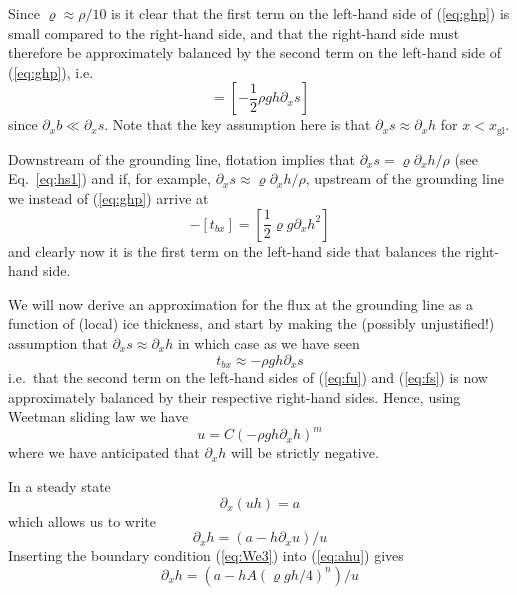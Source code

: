 \documentclass[10pt,a4paper]{book}
\newcommand{\p}{\partial}
\newcommand{\xgl}{x_{\mathrm{gl}}}
\begin{document}
Since $\varrho \approx \rho/10$ is it
clear that the first term on the left-hand side of (\ref{eq:ghp}) is
small compared to the right-hand side, and that the right-hand side
must therefore be approximately balanced by the second term on the
left-hand side of (\ref{eq:ghp}), i.e.
\begin{equation}
  [t_{bx}] = [-\frac{1}{2} \rho g h \p_x s]
\label{eq:ghp2}
\end{equation}
since $\p_x b \ll \p_x s$.  Note that the key assumption here is that
$\p_x s \approx \p_x h$ for $x < \xgl$.

Downstream of the
grounding line, flotation implies that $\p_x s = \varrho \p_x h/\rho$
(see Eq.~\ref{eq:hs1}) and if, for example, $\p_x s \approx 
\varrho \p_x h / \rho$, upstream of the grounding line we instead of
(\ref{eq:ghp}) arrive at
\begin{equation}
[\frac{1}{2}\varrho g h^2] - [t_{bx}] = [\frac{1}{2} \varrho g  \p_x h^2]
\label{eq:ghp}
\end{equation}
and clearly now it is the first term on the left-hand side that balances the right-hand
side.




We will now derive an approximation for the flux at the grounding line
as a function of (local) ice thickness, and start by making the
(possibly unjustified!) assumption that $\p_x s \approx \p_x h$ in which case as we have seen
\[
t_{bx} \approx - \rho g h \p_x s
\]
i.e.\ that the second term on the left-hand sides of (\ref{eq:fu}) and
(\ref{eq:fs}) is now approximately balanced by their respective right-hand
sides.  Hence, using Weetman sliding law we have
\begin{equation}
   u = C (-\rho g h \p_x h )^m 
\label{eq:uch}
\end{equation}
where we have anticipated that $\p_x h$ will be strictly negative. 


In a steady state
\begin{equation}
  \p_x (uh) = a 
\end{equation}
which allows us to write
\begin{equation}
 \p_x h =(a- h \p_x u)/u 
\label{eq:ahu}
\end{equation}
Inserting the boundary condition (\ref{eq:We3}) into (\ref{eq:ahu}) gives
\begin{equation}
\p_x h =(a- h A (\varrho g h/4)^n )/u 
\label{eq:ahA}
\end{equation}
\end{document}
